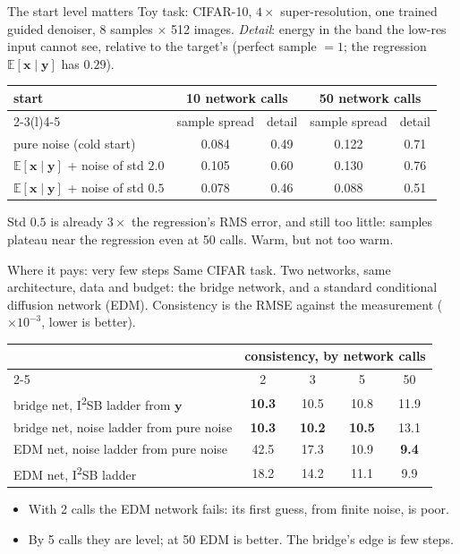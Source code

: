 \documentclass[aspectratio=169, 11pt]{beamer}
\newcommand{\x}{\bm{x}}
\newcommand{\y}{\bm{y}}
\newcommand{\E}{\mathbb{E}}
\begin{document}
\begin{frame}{The start level matters}
\small
Toy task: CIFAR-10, $4\times$ super-resolution, one trained guided denoiser, 8 samples
$\times$ 512 images. \emph{Detail}: energy in the band the low-res input cannot see, relative
to the target's (perfect sample $=1$; the regression $\E[\x\mid\y]$ has $0.29$).

\medskip
\centering
\begin{tabular}{@{}lcccc@{}}
\toprule
start & \multicolumn{2}{c}{10 network calls} & \multicolumn{2}{c}{50 network calls} \\
\cmidrule(lr){2-3}\cmidrule(l){4-5}
 & sample spread & detail & sample spread & detail \\
\midrule
pure noise (cold start)                          & 0.084 & 0.49 & 0.122 & 0.71 \\
$\E[\x\mid\y]$ + noise of std $2.0$             & 0.105 & 0.60 & 0.130 & 0.76 \\
$\E[\x\mid\y]$ + noise of std $0.5$             & 0.078 & 0.46 & 0.088 & 0.51 \\
\bottomrule
\end{tabular}

\medskip
\raggedright
Std $0.5$ is already $3\times$ the regression's RMS error, and still too little: samples
plateau near the regression even at 50 calls. Warm, but not too warm.
\end{frame}

\begin{frame}{Where it pays: very few steps}
\small
Same CIFAR task. Two networks, same architecture, data and budget: the bridge network, and a
standard conditional diffusion network (EDM). Consistency is the RMSE against the measurement
($\times10^{-3}$, lower is better).

\medskip
\centering
\begin{tabular}{@{}lcccc@{}}
\toprule
 & \multicolumn{4}{c}{consistency, by network calls} \\
\cmidrule(l){2-5}
 & 2 & 3 & 5 & 50 \\
\midrule
bridge net, I\textsuperscript{2}SB ladder from $\y$  & \textbf{10.3} & 10.5 & 10.8 & 11.9 \\
bridge net, noise ladder from pure noise        & \textbf{10.3} & \textbf{10.2} & \textbf{10.5} & 13.1 \\
EDM net, noise ladder from pure noise           & 42.5 & 17.3 & 10.9 & \textbf{9.4} \\
EDM net, I\textsuperscript{2}SB ladder               & 18.2 & 14.2 & 11.1 & 9.9 \\
\bottomrule
\end{tabular}

\medskip
\raggedright
\begin{itemize}
  \item With 2 calls the EDM network fails: its first guess, from finite noise, is poor.
  \item By 5 calls they are level; at 50 EDM is better. The bridge's edge is few steps.
\end{itemize}
\end{frame}
\end{document}
